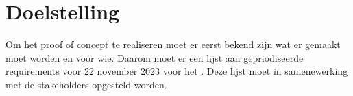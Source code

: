 \section{Doelstelling}
Om het proof of concept te realiseren moet er eerst bekend zijn wat er gemaakt moet worden en voor wie.
Daarom moet er een lijst aan gepriodiseerde requirements voor 22 november 2023 voor het .
Deze lijst moet in samenewerking met de stakeholders opgesteld worden.
